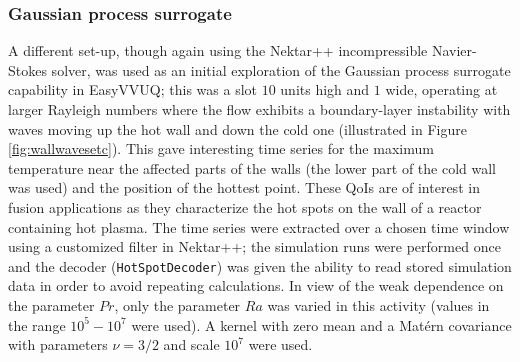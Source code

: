 \subsubsection{Gaussian process surrogate}

A different set-up, though again using the Nektar++ incompressible Navier-Stokes solver, was used as an initial exploration of the Gaussian process surrogate capability in EasyVVUQ; 
this was a slot $10$ units high and $1$ wide, operating at larger Rayleigh numbers where the flow exhibits a boundary-layer instability with waves moving up the hot wall and down the cold one (illustrated in Figure \ref{fig:wallwavesetc}).  
This gave interesting time series for the maximum temperature near the affected parts of the walls (the lower part of the cold wall was used) and the position of the hottest point.  
These QoIs are of interest in fusion applications as they characterize the hot spots on the wall of a reactor containing hot plasma.  
The time series were extracted over a chosen time window using a customized filter in Nektar++; 
the simulation runs were performed once and the decoder (\texttt{HotSpotDecoder}) was given the ability to read stored simulation data in order to avoid repeating calculations.
In view of the weak dependence on the parameter $Pr$, only the parameter $Ra$ was varied in this activity (values in the range $10^5-10^7$ were used).  
A kernel with zero mean and a Mat\'ern covariance with parameters $\nu=3/2$ and scale $10^7$ were used.

